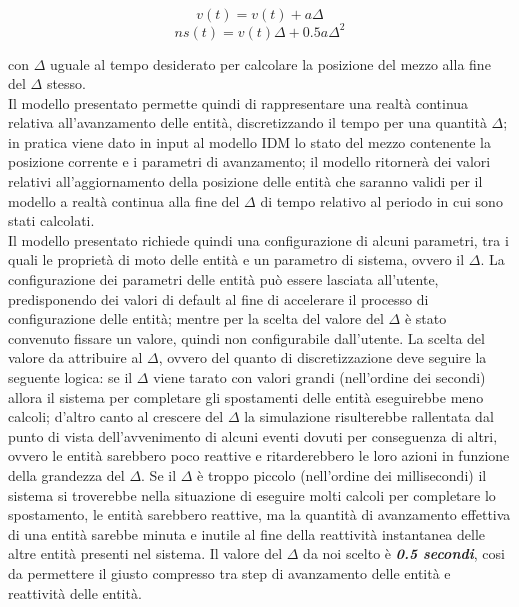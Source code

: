 \begin{equation}
v(t)= v(t)+a\Delta
\end{equation}
\begin{equation}
ns(t)= v(t)\Delta+0.5a\Delta^2
\end{equation}

con $\Delta$ uguale al tempo desiderato per calcolare la posizione del mezzo alla fine del $\Delta$ stesso. \\
Il modello presentato permette quindi di rappresentare una realtà continua relativa all'avanzamento delle entità, discretizzando il tempo per una quantità $\Delta$; in pratica viene dato in input al modello IDM lo stato del mezzo contenente la posizione corrente e i parametri di avanzamento; il modello ritornerà dei valori relativi all'aggiornamento della posizione delle entità che saranno validi per il modello a realtà continua alla fine del $\Delta$ di tempo relativo al periodo in cui sono stati calcolati.\\
Il modello presentato richiede quindi una configurazione di alcuni parametri, tra i quali le proprietà di moto delle entità e un parametro di sistema, ovvero il $\Delta$. La configurazione dei parametri delle entità può essere lasciata all'utente, predisponendo dei valori di default al fine di accelerare il processo di configurazione delle entità; mentre per la scelta del valore del $\Delta$ è stato convenuto fissare un valore, quindi non configurabile dall'utente. La scelta del valore da attribuire al $\Delta$, ovvero del quanto di discretizzazione deve seguire la seguente logica: se il $\Delta$ viene tarato con valori grandi (nell'ordine dei secondi) allora il sistema per completare gli spostamenti delle entità eseguirebbe meno calcoli; d'altro canto al crescere del $\Delta$ la simulazione risulterebbe rallentata dal punto di vista dell'avvenimento di alcuni eventi dovuti per conseguenza di altri, ovvero le entità sarebbero poco reattive e ritarderebbero le loro azioni in funzione della grandezza del $\Delta$. Se il $\Delta$ è troppo piccolo (nell'ordine dei millisecondi) il sistema si troverebbe nella situazione di eseguire molti calcoli per completare lo spostamento, le entità sarebbero reattive, ma la quantità di avanzamento effettiva di una entità sarebbe minuta e inutile al fine della reattività instantanea delle altre entità presenti nel sistema. Il valore del $\Delta$ da noi scelto è \textbf{\textit{0.5 secondi}}, cosi da permettere il giusto compresso tra step di avanzamento delle entità e reattività delle entità. 